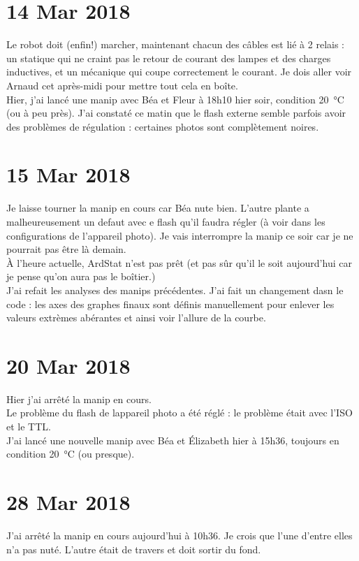 \documentclass[10pt,a4paper]{article}
\begin{document}
\section{14 Mar 2018}
Le robot doit (enfin!) marcher, maintenant chacun des câbles est lié à 2 relais : un statique qui ne craint pas le retour de courant des lampes et des charges inductives, et un mécanique qui coupe correctement le courant. Je dois aller voir Arnaud cet après-midi pour mettre tout cela en boîte.\\

Hier, j'ai lancé une manip avec Béa et Fleur à 18h10 hier soir, condition \SI{20}{\celsius} (ou à peu près). J'ai constaté ce matin que le flash externe semble parfois avoir des problèmes de régulation : certaines photos sont complètement noires.

\section{15 Mar 2018}
Je laisse tourner la manip en cours car Béa nute bien. L'autre plante a malheureusement un defaut avec e flash qu'il faudra régler (à voir dans les configurations de l'appareil photo). Je vais interrompre la manip ce soir car je ne pourrait pas être là demain.\\

À l'heure actuelle, ArdStat n'est pas prêt (et pas sûr qu'il le soit aujourd'hui car je pense qu'on aura pas le boîtier.)\\

J'ai refait les analyses des manips précédentes. J'ai fait un changement dasn le code : les axes des graphes finaux sont définis manuellement pour enlever les valeurs extrèmes abérantes et ainsi voir l'allure de la courbe.

\section{20 Mar 2018}
Hier j'ai arrêté la manip en cours.\\
Le problème du flash de lappareil photo a été réglé : le problème était avec l'ISO et le TTL.\\

J'ai lancé une nouvelle manip avec Béa et Élizabeth hier à 15h36, toujours en condition \SI{20}{\celsius} (ou presque).

\section{28 Mar 2018}
J'ai arrêté la manip en cours aujourd'hui à 10h36. Je crois que l'une d'entre elles n'a pas nuté. L'autre était de travers et doit sortir du fond.\\
\end{document}
